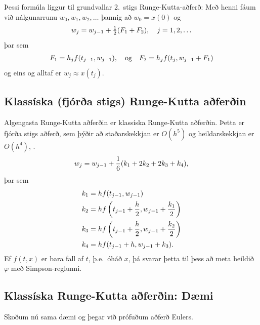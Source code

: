 \documentclass[letterpaper,10pt,icelandic]{sphinxmanual}
\begin{document}
Þessi formúla liggur til grundvallar 2. stigs Runge-Kutta-aðferð: Með
henni fáum við nálgunarrunu \(w_0, w_1, w_2, \ldots\) þannig að
\(w_0=x(0)\) og
\begin{gather}
\begin{split}w_j = w_{j-1} + \tfrac{1}{2}(F_1 + F_2), \quad j = 1,2,\ldots\end{split}\notag
\end{gather}
þar sem
\begin{gather}
\begin{split}F_1 = h_jf(t_{j-1},w_{j-1}),
  \quad \text{og} \quad
  F_2 = h_jf(t_j,w_{j-1}+F_1)\end{split}\notag
\end{gather}
og eins og alltaf er \(w_j \approx x(t_j)\).


\subsection{Klassíska (fjórða stigs) Runge-Kutta aðferðin}
\label{kafli06:index-12}\label{kafli06:klassiska-fjora-stigs-runge-kutta-aferin}
Algengasta Runge-Kutta aðferðin er klassíska Runge-Kutta aðferðin. Þetta
er fjórða stigs aðferð, sem þýðir að staðarskekkjan er \(O(h^5)\) og
heildarskekkjan er \(O(h^4)\), .
\begin{gather}
\begin{split}w_{j} = w_{j-1} + \frac 16(k_1 + 2k_2 + 2k_3 + k_4),\end{split}\notag
\end{gather}
þar sem
\begin{gather}
\begin{split}\begin{aligned}
  k_1 &= hf(t_{j-1},w_{j-1}) \\
  k_2 &= hf\left(t_{j-1} + \frac h2,w_{j-1}+ \frac{k_1}2\right) \\
  k_3 &= hf\left(t_{j-1} + \frac h2,w_{j-1}+ \frac{k_2}2\right) \\
  k_4 &= hf(t_{j-1} + h,w_{j-1}+ k_3).
 \end{aligned}\end{split}\notag
\end{gather}
Ef \(f(t,x)\) er bara fall af \(t\), þ.e. óháð \(x\), þá
svarar þetta til þess að meta heildið \({\varphi}\) með
Simpson-reglunni.


\subsection{Klassíska Runge-Kutta aðferðin: Dæmi}
\label{kafli06:klassiska-runge-kutta-aferin-daemi}
Skoðum nú sama dæmi og þegar við prófuðum aðferð Eulers.
\end{document}
